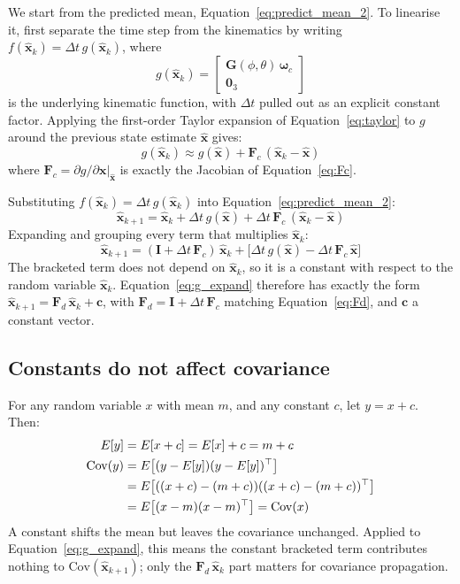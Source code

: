 \documentclass[12pt,a4paper]{article}
\newcommand{\bx}{\bm{x}}
\newcommand{\bF}{\bm{F}}
\newcommand{\bG}{\bm{G}}
\newcommand{\bI}{\bm{I}}
\newcommand{\bomega}{\bm{\omega}}
\begin{document}
{We start from the predicted mean, Equation~\eqref{eq:predict_mean_2}. To
linearise it, first separate the time step from the kinematics by writing
$f(\hat{\bx}_k) = \Delta t\, g(\hat{\bx}_k)$, where
\begin{equation}
  g(\hat{\bx}_k) =
  \begin{bmatrix}
    \bG(\phi,\theta)\,\bomega_c \\
    \bm{0}_3
  \end{bmatrix}
\end{equation}
is the underlying kinematic function, with $\Delta t$ pulled out as an
explicit constant factor. Applying the first-order Taylor expansion of
Equation~\eqref{eq:taylor} to $g$ around the previous state estimate
$\hat{\bx}$ gives:
\begin{equation}
  g(\hat{\bx}_k) \approx g(\hat{\bx}) + \bF_c\,(\hat{\bx}_k - \hat{\bx})
\end{equation}
where $\bF_c = \partial g/\partial \bx|_{\hat{\bx}}$ is exactly the Jacobian
of Equation~\eqref{eq:Fc}.

Substituting $f(\hat{\bx}_k) = \Delta t\, g(\hat{\bx}_k)$ into
Equation~\eqref{eq:predict_mean_2}:
\begin{equation}
  \hat{\bx}_{k+1} = \hat{\bx}_k + \Delta t\, g(\hat{\bx})
                    + \Delta t\,\bF_c\,(\hat{\bx}_k - \hat{\bx})
  \label{eq:predict_mean_3}
\end{equation}
Expanding and grouping every term that multiplies $\hat{\bx}_k$:
\begin{equation}
  \hat{\bx}_{k+1} = (\bI + \Delta t\,\bF_c)\,\hat{\bx}_k
                    + \big[\Delta t\, g(\hat{\bx}) - \Delta t\,\bF_c\,\hat{\bx}\big]
  \label{eq:g_expand}
\end{equation}
The bracketed term does not depend on $\hat{\bx}_k$, so it is a constant
with respect to the random variable $\hat{\bx}_k$. Equation~\eqref{eq:g_expand}
therefore has exactly the form $\hat{\bx}_{k+1} = \bF_d\,\hat{\bx}_k + \bm{c}$,
with $\bF_d = \bI + \Delta t\,\bF_c$ matching Equation~\eqref{eq:Fd}, and
$\bm{c}$ a constant vector.

\subsection{Constants do not affect covariance}

For any random variable $x$ with mean $m$, and any constant $c$, let
$y = x + c$. Then:
\begin{align}
  E[y] &= E[x + c] = E[x] + c = m + c \\
  \mathrm{Cov}(y) &= E\big[(y - E[y])(y - E[y])^\top\big] \notag \\
                   &= E\big[((x+c) - (m+c))((x+c) - (m+c))^\top\big] \notag \\
                   &= E\big[(x-m)(x-m)^\top\big] = \mathrm{Cov}(x)
\end{align}
A constant shifts the mean but leaves the covariance unchanged. Applied to
Equation~\eqref{eq:g_expand}, this means the constant bracketed term
contributes nothing to $\mathrm{Cov}(\hat{\bx}_{k+1})$; only the
$\bF_d\,\hat{\bx}_k$ part matters for covariance propagation.

}
\end{document}
